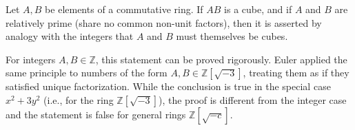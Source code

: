 Let $A, B$ be elements of a commutative ring. If $AB$ is a cube, and if $A$ and $B$ are relatively prime (share no common non-unit factors), then it is asserted by analogy with the integers that $A$ and $B$ must themselves be cubes.

For integers $A, B \in \mathbb{Z}$, this statement can be proved rigorously. Euler applied the same principle to numbers of the form $A, B \in \mathbb{Z}[\sqrt{-3}]$, treating them as if they satisfied unique factorization. While the conclusion is true in the special case $x^2 + 3y^2$ (i.e., for the ring $\mathbb{Z}[\sqrt{-3}]$), the proof is different from the integer case and the statement is false for general rings $\mathbb{Z}[\sqrt{-c}]$.
